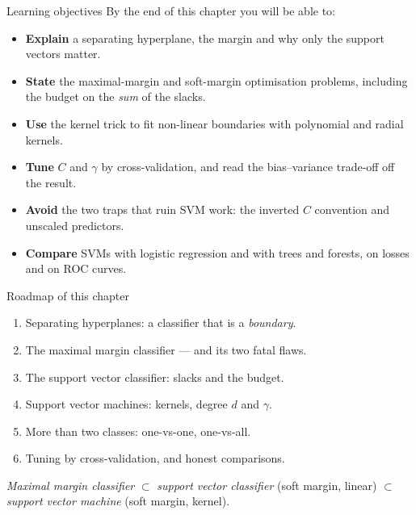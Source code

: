 \documentclass[aspectratio=169,11pt]{beamer}
\begin{document}
\begin{frame}{Learning objectives}
  \footnotesize
  By the end of this chapter you will be able to:
  \begin{itemize}
    \item \textbf{Explain} a separating hyperplane, the margin and why only the
          support vectors matter.
    \item \textbf{State} the maximal-margin and soft-margin optimisation
          problems, including the budget on the \emph{sum} of the slacks.
    \item \textbf{Use} the kernel trick to fit non-linear boundaries with
          polynomial and radial kernels.
    \item \textbf{Tune} $C$ and $\gamma$ by cross-validation, and read the
          bias--variance trade-off off the result.
    \item \textbf{Avoid} the two traps that ruin SVM work: the inverted $C$
          convention and unscaled predictors.
    \item \textbf{Compare} SVMs with logistic regression and with trees and
          forests, on losses and on ROC curves.
  \end{itemize}
\end{frame}

\begin{frame}{Roadmap of this chapter}
  \begin{takeaway}
    \begin{enumerate}
      \item Separating hyperplanes: a classifier that is a \emph{boundary}.
      \item The maximal margin classifier --- and its two fatal flaws.
      \item The support vector classifier: slacks and the budget.
      \item Support vector machines: kernels, degree $d$ and $\gamma$.
      \item More than two classes: one-vs-one, one-vs-all.
      \item Tuning by cross-validation, and honest comparisons.
    \end{enumerate}
  \end{takeaway}
  \begin{takeaway}
    \emph{Maximal margin classifier} $\subset$ \emph{support vector
    classifier} (soft margin, linear) $\subset$ \emph{support vector machine}
    (soft margin, kernel).
  \end{takeaway}
\end{frame}
\end{document}
